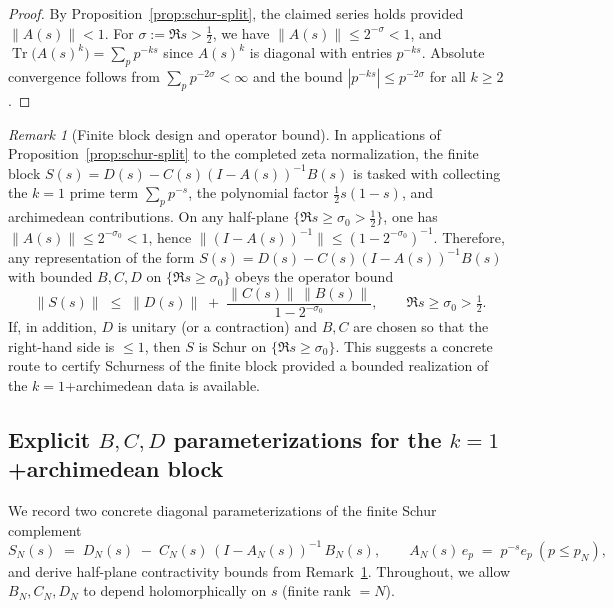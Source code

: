 \documentclass[11pt]{article}
\theoremstyle{definition}
\theoremstyle{remark}
\newtheorem{remark}[theorem]{Remark}
\DeclareMathOperator{\Tr}{Tr}
\begin{document}
\begin{proof}
By Proposition~\ref{prop:schur-split}, the claimed series holds provided \(\|A(s)\|<1\). For \(\sigma:=\Re s>\tfrac12\), we have \(\|A(s)\|\le 2^{-\sigma}<1\), and \(\Tr\big(A(s)^k\big)=\sum_p p^{-ks}\) since \(A(s)^k\) is diagonal with entries \(p^{-ks}\). Absolute convergence follows from \(\sum_p p^{-2\sigma}<\infty\) and the bound \(|p^{-ks}|\le p^{-2\sigma}\) for all \(k\ge 2\).
\end{proof}
\begin{remark}[Finite block design and operator bound]\label{rem:finite-block-design}
In applications of Proposition~\ref{prop:schur-split} to the completed zeta normalization, the finite block \(S(s)=D(s)-C(s)(I-A(s))^{-1}B(s)\) is tasked with collecting the \(k=1\) prime term \(\sum_p p^{-s}\), the polynomial factor \(\tfrac12 s(1-s)\), and archimedean contributions. On any half-plane \(\{\Re s\ge \sigma_0>\tfrac12\}\), one has \(\|A(s)\|\le 2^{-\sigma_0}<1\), hence \(\|(I-A(s))^{-1}\|\le (1-2^{-\sigma_0})^{-1}\). Therefore, any representation of the form \(S(s)=D(s)-C(s)(I-A(s))^{-1}B(s)\) with bounded \(B,C,D\) on \(\{\Re s\ge \sigma_0\}\) obeys the operator bound
\[
 \|S(s)\|\;\le\;\|D(s)\|\; +\; \frac{\|C(s)\|\,\|B(s)\|}{1-2^{-\sigma_0}},\qquad \Re s\ge \sigma_0>\tfrac12.
\]
If, in addition, \(D\) is unitary (or a contraction) and \(B,C\) are chosen so that the right-hand side is \(\le 1\), then \(S\) is Schur on \(\{\Re s\ge \sigma_0\}\). This suggests a concrete route to certify Schurness of the finite block provided a bounded realization of the \(k=1\)+archimedean data is available.
\end{remark}

\subsection{Explicit $B,C,D$ parameterizations for the $k=1$+archimedean block}\label{subsec:BCD-params}
We record two concrete diagonal parameterizations of the finite Schur complement
\[
 S_N(s)\;=\;D_N(s)\; -\; C_N(s)\,(I-A_N(s))^{-1}\,B_N(s),\qquad A_N(s)\,e_p\;=\;p^{-s}e_p\ (p\le p_N),
\]
and derive half-plane contractivity bounds from Remark~\ref{rem:finite-block-design}. Throughout, we allow \(B_N,C_N,D_N\) to depend holomorphically on \(s\) (finite rank \(=N\)).
\end{document}
